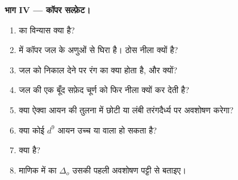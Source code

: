 \begin{problem}
\medskip
\noindent\textbf{भाग IV --- कॉपर सल्फ़ेट।}
\begin{enumerate}[resume]
  \item {} का विन्यास क्या है?
  \item {} में कॉपर जल के अणुओं से घिरा है। ठोस नीला क्यों है?
  \item जल को निकाल देने पर रंग का क्या होता है, और क्यों?
  \item जल की एक बूँद सफ़ेद चूर्ण को फिर नीला क्यों कर देती है?
  \item क्या  ऐक्वा आयन की तुलना में छोटी या लंबी तरंगदैर्ध्य पर अवशोषण करेगा?
  \item क्या कोई $d^9$ आयन उच्च या  वाला हो सकता है?
  \item क्या   है?
  \item माणिक में  का $\Delta_o$ उसकी पहली अवशोषण पट्टी से बताइए।
\end{enumerate}
\end{problem}
